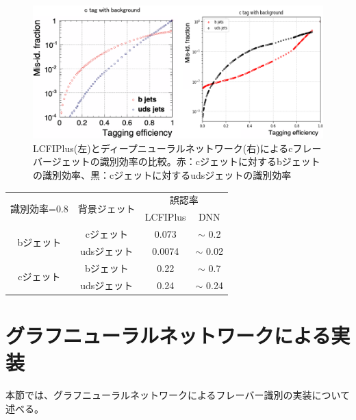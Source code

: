 \begin{figure}[H]
	\begin{center}
 \includegraphics[keepaspectratio, scale=0.38]
 	{Figure/Flavortagging/dnneff_c.png}
 		\caption{LCFIPlus(左)とディープニューラルネットワーク(右)によるcフレーバージェットの識別効率の比較。赤：cジェットに対するbジェットの識別効率、黒：cジェットに対するudsジェットの識別効率}
 		\label{dnneff_c}
	\end{center}
\end{figure}
\begin{table}[H]
 \centering
  \begin{tabular}{ |c|c|c|c|}
   \hline
   \multirow{2}{*}{識別効率=0.8} & \multirow{2}{*}{背景ジェット} & \multicolumn{2}{c|}{誤認率} \\ \cline{3-4} 
    & & LCFIPlus & DNN\\ \cline{3-4} 
    \hline
    \hline
   \multirow{2}{*}{bジェット} & cジェット & 0.073 & $\sim$ 0.2\\ \cline{2-2} 
   & udsジェット & 0.0074 & $\sim$ 0.02 \\ \cline{1-2} 
   \multirow{2}{*}{cジェット} & bジェット & 0.22 & $\sim$ 0.7\\ \cline{2-2} 
   & udsジェット & 0.24 & $\sim$ 0.24\\
   \hline
  \end{tabular}
  \label{dnneff80}
\end{table}

\section{グラフニューラルネットワークによる実装}
本節では、グラフニューラルネットワークによるフレーバー識別の実装について述べる。
